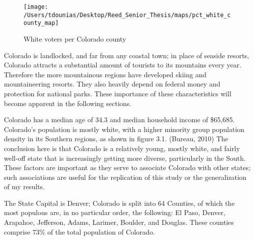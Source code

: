 \documentclass[12pt,twoside]{reedthesis}
\begin{document}
  \begin{figure}
  
  {\centering \texttt{[image: /Users/tdounias/Desktop/Reed\_Senior\_Thesis/maps/pct\_white\_county\_map]} 
  
  }
  
  \caption[White voters per Colorado county]{White voters per Colorado county}\label{fig:white pct map}
  \end{figure}
  
  Colorado is landlocked, and far from any coastal town; in place of
  seaside resorts, Colorado attracts a substantial amount of tourists to
  its mountains every year. Therefore the more mountainous regions have
  developed skiing and mountaineering resorts. They also heavily depend on
  federal money and protection for national parks. These importance of
  these characteristics will become apparent in the following sections.
  
  Colorado has a median age of 34.3 and median household income of
  \$65,685. Colorado's population is mostly white, with a higher minority
  group population density in its Southern regions, as shown in figure
  3.1. (Bureau, 2010) The conclusion here is that Colorado is a relatively
  young, mostly white, and fairly well-off state that is increasingly
  getting more diverse, particularly in the South. These factors are
  important as they serve to associate Colorado with other states; such
  associations are useful for the replication of this study or the
  generalization of my results.
  
  The State Capital is Denver; Colorado is split into 64 Counties, of
  which the most populous are, in no particular order, the following: El
  Paso, Denver, Arapahoe, Jefferson, Adams, Larimer, Boulder, and Douglas.
  These counties comprise 73\% of the total population of Colorado.
  
\end{document}
